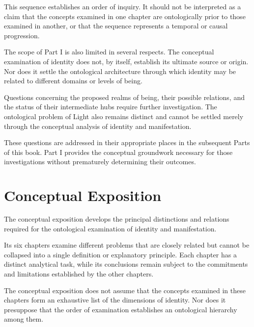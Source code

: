This sequence establishes an order of inquiry. It should
not be interpreted as a claim that the concepts examined
in one chapter are ontologically prior to those examined
in another, or that the sequence represents a temporal
or causal progression.

The scope of Part I is also limited in several respects.
The conceptual examination of identity does not, by
itself, establish its ultimate source or origin. Nor does
it settle the ontological architecture through which
identity may be related to different domains or levels
of being.

Questions concerning the proposed realms of being,
their possible relations, and the status of their
intermediate hubs require further investigation.
The ontological problem of Light also remains distinct
and cannot be settled merely through the conceptual
analysis of identity and manifestation.

These questions are addressed in their appropriate
places in the subsequent Parts of this book. Part I
provides the conceptual groundwork necessary for those
investigations without prematurely determining their
outcomes.



\section*{Conceptual Exposition}

The conceptual exposition develops the principal
distinctions and relations required for the ontological
examination of identity and manifestation.

Its six chapters examine different problems that are
closely related but cannot be collapsed into a single
definition or explanatory principle. Each chapter has
a distinct analytical task, while its conclusions
remain subject to the commitments and limitations
established by the other chapters.

The conceptual exposition does not assume that the
concepts examined in these chapters form an exhaustive
list of the dimensions of identity. Nor does it
presuppose that the order of examination establishes
an ontological hierarchy among them.



